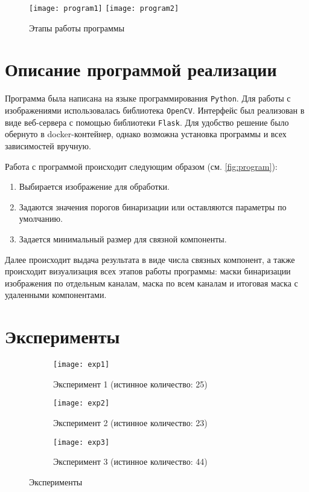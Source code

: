 \documentclass[11pt]{extarticle}
\begin{document}
\begin{figure}[h]
  \centering
  \texttt{[image: program1]}
  \texttt{[image: program2]}
  \caption{Этапы работы программы}
  \label{fig:program}
\end{figure}

\section{Описание программой реализации}
Программа была написана на языке программирования \verb|Python|. Для работы с изображениями использовалась библиотека \verb|OpenCV|. Интерфейс был реализован в виде веб-сервера с помощью библиотеки \verb|Flask|. Для удобство решение было обернуто в docker-контейнер, однако возможна установка программы и всех зависимостей вручную.

Работа с программой происходит следующим образом (см. \autoref{fig:program}):
\begin{enumerate}
  \item Выбирается изображение для обработки.
  \item Задаются значения порогов бинаризации или оставляются параметры по умолчанию.
  \item Задается минимальный размер для связной компоненты.
\end{enumerate}
Далее происходит выдача результата в виде числа связных компонент, а также происходит визуализация всех этапов работы программы: маски бинаризации изображения по отдельным каналам, маска по всем каналам и итоговая маска с удаленными компонентами.
 
\section{Эксперименты}

\begin{figure}[h]
  \centering
  \begin{subfigure}[b]{0.6\textwidth}
    \texttt{[image: exp1]}
    \caption{Эксперимент 1 (истинное количество: 25)}
  \end{subfigure}
  \begin{subfigure}[b]{0.45\textwidth}
    \texttt{[image: exp2]}
    \caption{Эксперимент 2 (истинное количество: 23)}
  \end{subfigure}
  \begin{subfigure}[b]{0.45\textwidth}
    \texttt{[image: exp3]}
    \caption{Эксперимент 3 (истинное количество: 44)}
  \end{subfigure}
  \caption{Эксперименты}
  \label{fig:exp}
\end{figure}
\end{document}
